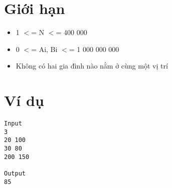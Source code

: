 \section{   Giới hạn  }
\begin{itemize}
	\item     1 $<$= N $<$= 400 000   
	\item     0 $<$= Ai, Bi $<$= 1 000 000 000   
	\item     Không có hai gia đình nào nằm ở cùng một vị trí   
\end{itemize}

\section{   Ví dụ  }
\begin{verbatim}
Input
3 
20 100 
30 80
200 150

Output
85
\end{verbatim}